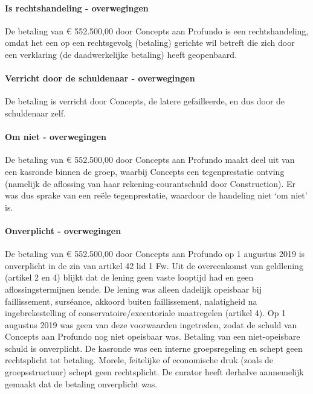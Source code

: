 \documentclass[
  dutch,
  a4paper,
]{article}
\begin{document}
\paragraph{Is rechtshandeling - overwegingen}\label{is-rechtshandeling---overwegingen-36}

De betaling van € 552.500,00 door Concepts aan Profundo is een rechtshandeling, omdat het een op een rechtsgevolg (betaling) gerichte wil betreft die zich door een verklaring (de daadwerkelijke betaling) heeft geopenbaard.

\paragraph{Verricht door de schuldenaar - overwegingen}\label{verricht-door-de-schuldenaar---overwegingen-36}

De betaling is verricht door Concepts, de latere gefailleerde, en dus door de schuldenaar zelf.

\paragraph{Om niet - overwegingen}\label{om-niet---overwegingen-36}

De betaling van € 552.500,00 door Concepts aan Profundo maakt deel uit van een kasronde binnen de groep, waarbij Concepts een tegenprestatie ontving (namelijk de aflossing van haar rekening-courantschuld door Construction). Er was dus sprake van een reële tegenprestatie, waardoor de handeling niet `om niet' is.

\paragraph{Onverplicht - overwegingen}\label{onverplicht---overwegingen-36}

De betaling van € 552.500,00 door Concepts aan Profundo op 1 augustus 2019 is onverplicht in de zin van artikel 42 lid 1 Fw. Uit de overeenkomst van geldlening (artikel 2 en 4) blijkt dat de lening geen vaste looptijd had en geen aflossingstermijnen kende. De lening was alleen dadelijk opeisbaar bij faillissement, surséance, akkoord buiten faillissement, nalatigheid na ingebrekestelling of conservatoire/executoriale maatregelen (artikel 4). Op 1 augustus 2019 was geen van deze voorwaarden ingetreden, zodat de schuld van Concepts aan Profundo nog niet opeisbaar was. Betaling van een niet-opeisbare schuld is onverplicht. De kasronde was een interne groepsregeling en schept geen rechtsplicht tot betaling. Morele, feitelijke of economische druk (zoals de groepsstructuur) schept geen rechtsplicht. De curator heeft derhalve aannemelijk gemaakt dat de betaling onverplicht was.
\end{document}
